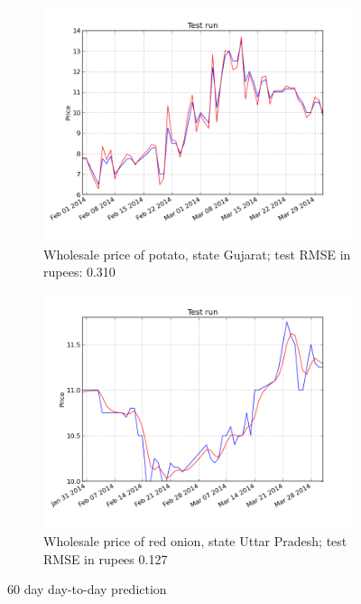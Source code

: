 \begin{figure}[!ht]
    \centering
        \begin{subfigure}[b]{.45\textwidth}
        \centering
        \includegraphics[width=\textwidth]{./img/plots/esn/daily/gujarat_potato_online_60d_1d.png}
        \caption{Wholesale price of potato, state Gujarat; test RMSE in rupees: 0.310} 
        \label{subfig:res_60d_1}
        \end{subfigure}
        \quad
        \begin{subfigure}[b]{.45\textwidth}
        \centering
        \includegraphics[width=\textwidth]{./img/plots/esn/daily/uttar_pradesh_redonion_60d_1d.png}
        \caption{Wholesale price of red onion, state Uttar Pradesh; test RMSE in rupees 0.127}
        \label{subfig:res_60d_2}
        \end{subfigure}

    \caption{60 day day-to-day prediction}   
    \label{fig:res_60d}
\end{figure}

